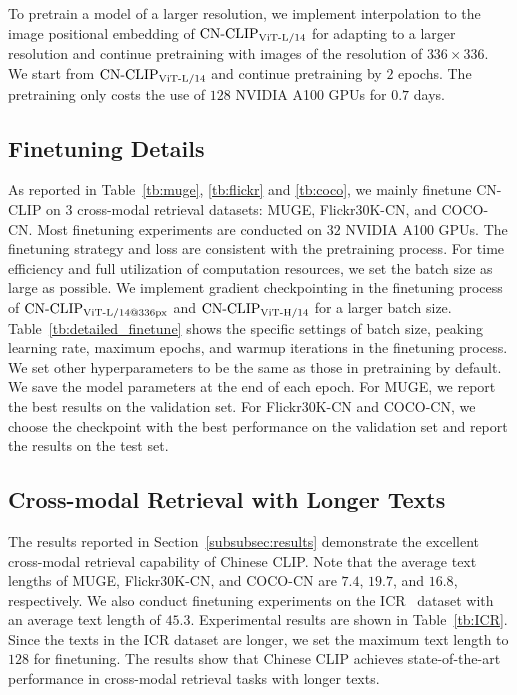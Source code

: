 To pretrain a model of a larger resolution, we implement interpolation to the image positional embedding of $\text{CN-CLIP}\rm_{ViT\text{-}L/14}$ for adapting to a larger resolution and continue pretraining with images of the resolution of $336 \times 336$. 
We start from $\text{CN-CLIP}\rm_{ViT\text{-}L/14}$ and continue pretraining by $2$ epochs. 
The pretraining only costs the use of $128$ NVIDIA A100 GPUs for $0.7$ days.

\subsection{Finetuning Details}


As reported in Table~\ref{tb:muge}, \ref{tb:flickr} and \ref{tb:coco}, we mainly finetune CN-CLIP on $3$ cross-modal retrieval datasets: MUGE, Flickr30K-CN, and COCO-CN.
Most finetuning experiments are conducted on $32$ NVIDIA A100 GPUs.
The finetuning strategy and loss are consistent with the pretraining process.
For time efficiency and full utilization of computation resources, we set the batch size as large as possible.
We implement gradient checkpointing in the finetuning process of $\text{CN-CLIP}\rm_{ViT\text{-}L/14@336px}$ and $\text{CN-CLIP}\rm_{ViT\text{-}H/14}$ for a larger batch size.
Table~\ref{tb:detailed_finetune} shows the specific settings of batch size, peaking learning rate, maximum epochs, and warmup iterations in the finetuning process.
We set other hyperparameters to be the same as those in pretraining by default.
We save the model parameters at the end of each epoch.
For MUGE, we report the best results on the validation set.
For Flickr30K-CN and COCO-CN, we choose the checkpoint with the best performance on the validation set and report the results on the test set.


\subsection{Cross-modal Retrieval with Longer Texts}
The results reported in Section~\ref{subsubsec:results} demonstrate the excellent cross-modal retrieval capability of Chinese CLIP.
Note that the average text lengths of MUGE, Flickr30K-CN, and COCO-CN are $7.4$, $19.7$, and $16.8$, respectively.
We also conduct finetuning experiments on the ICR~\citep{r2d2} dataset with an average text length of $45.3$. 
Experimental results are shown in Table~\ref{tb:ICR}.
Since the texts in the ICR dataset are longer, we set the maximum text length to $128$ for finetuning.
The results show that Chinese CLIP achieves state-of-the-art performance in cross-modal retrieval tasks with longer texts.

